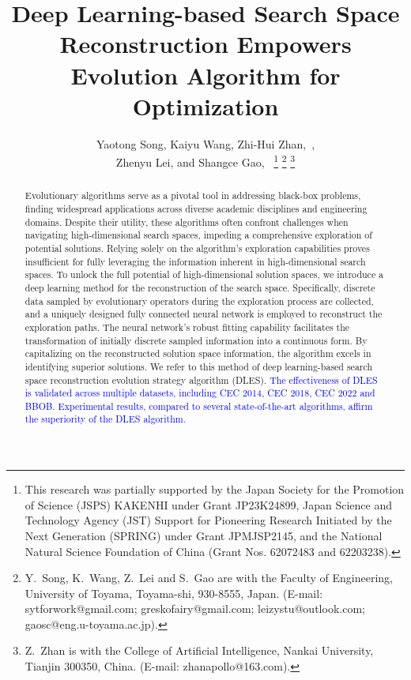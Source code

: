 \documentclass[journal,twoside]{IEEEtran}
\begin{document}
\title{Deep Learning-based Search Space Reconstruction Empowers Evolution Algorithm for Optimization}
\author{
    Yaotong Song,  Kaiyu Wang, Zhi-Hui Zhan,~, \\
    Zhenyu Lei, and Shangce Gao,~  
    \thanks{\quad This research was partially supported by the Japan Society for the Promotion of Science (JSPS) KAKENHI under Grant JP23K24899, Japan Science and Technology Agency (JST) Support for Pioneering Research Initiated by the Next Generation (SPRING) under Grant JPMJSP2145, and the National Natural Science Foundation of China (Grant Nos. 62072483 and 62203238).}
    \thanks{\quad Y.~Song, K.~Wang, Z.~Lei and S.~Gao are with the Faculty of Engineering, University of Toyama, Toyama-shi, 930-8555, Japan. (E-mail: sytforwork@gmail.com; greskofairy@gmail.com; leizystu@outlook.com; gaosc@eng.u-toyama.ac.jp).}
	\thanks{\quad Z.~Zhan  is with the College of Artificial Intelligence, Nankai University, Tianjin 300350, China. (E-mail: zhanapollo@163.com).} 
}

\maketitle

\begin{abstract}
Evolutionary algorithms serve as a pivotal tool in addressing black-box problems, finding widespread applications across diverse academic disciplines and engineering domains. Despite their utility, these algorithms often confront challenges when navigating high-dimensional search spaces, impeding a comprehensive exploration of potential solutions. Relying solely on the algorithm's exploration capabilities proves insufficient for fully leveraging the information inherent in high-dimensional search spaces. To unlock the full potential of high-dimensional solution spaces, we introduce a deep learning method for the reconstruction of the search space. Specifically, discrete data sampled by evolutionary operators during the exploration process are collected, and a uniquely designed fully connected neural network is employed to reconstruct the exploration paths. The neural network's robust fitting capability facilitates the transformation of initially discrete sampled information into a continuous form. By capitalizing on the reconstructed solution space information, the algorithm excels in identifying superior solutions. We refer to this method of deep learning-based search space reconstruction evolution strategy algorithm (DLES). \textcolor{blue}{The effectiveness of DLES is validated across multiple datasets, including CEC 2014, CEC 2018, CEC 2022 and BBOB. Experimental results, compared to several state-of-the-art algorithms, affirm the superiority of the DLES algorithm.}
\end{abstract}
\end{document}
